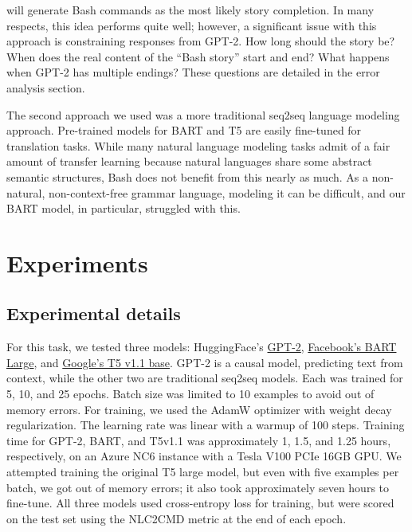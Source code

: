 \documentclass{article}
\begin{document}
will generate Bash commands as the most likely story completion. In many
respects, this idea performs quite well; however, a significant issue with this
approach is constraining responses from GPT-2. How long should the story be?
When does the real content of the ``Bash story'' start and end? What happens
when GPT-2 has multiple endings? These questions are detailed in the error
analysis section.
\par
The second approach we used was a more traditional seq2seq language modeling
approach. Pre-trained models for BART and T5 are easily fine-tuned for
translation tasks. While many natural language modeling tasks admit of a fair
amount of transfer learning because natural languages share some abstract
semantic structures, Bash does not benefit from this nearly as much. As a
non-natural, non-context-free grammar language, modeling it can be difficult,
and our BART model, in particular, struggled with this.

\section{Experiments}


\subsection{Experimental details}
For this task, we tested three models: HuggingFace's
\href{https://huggingface.co/GPT-2}{GPT-2}\cite{GPT-2},
\href{https://huggingface.co/facebook/bart-large}{Facebook's BART
	Large}\cite{bart}, and \href{https://huggingface.co/google/t5-v1_1-base}{Google's T5 v1.1
  base}. GPT-2 is a causal model, predicting text from context, while the other
  two are traditional seq2seq models. Each was trained for 5, 10, and 25
  epochs. Batch size was limited to 10 examples to avoid out of memory errors.
  For training, we used the AdamW optimizer with weight decay regularization.
  The learning rate was linear with a warmup of 100 steps. Training time for
  GPT-2, BART, and T5v1.1 was approximately 1, 1.5, and 1.25 hours,
  respectively, on an Azure NC6 instance with a Tesla V100 PCIe 16GB GPU. We
  attempted training the original T5 large model, but even with five examples per
  batch, we got out of memory errors; it also took approximately seven hours to
  fine-tune. All three models used cross-entropy loss for training, but were scored
  on the test set using the NLC2CMD metric at the end of each epoch.
\end{document}
